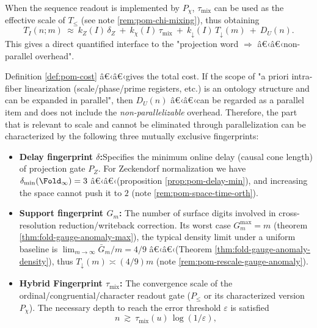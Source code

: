 \begin{remark}\label{rem:pom-cost-chi}
When the sequence readout is implemented by $P_\chi$, $\tau_{\mathrm{mix}}$ can be used as the effective scale of $T_{\le}$ (see note \ref{rem:pom-chi-mixing}), thus obtaining
\[
T_I(n;m)\ \approx\ k_Z(I)\,\delta_Z\ +\ k_\chi(I)\,\tau_{\mathrm{mix}}\ +\ k_{\downarrow}(I)\,T_{\downarrow}(m)\ +\ D_U(n).
\]
This gives a direct quantified interface to the "projection word $\Rightarrow$ â€‹â€‹non-parallel overhead".
\end{remark}

\begin{remark}\label{rem:pom-nonparallel-three-meters}
Definition \ref{def:pom-cost} â€‹â€‹gives the total cost.
If the scope of "a priori intra-fiber linearization (scale/phase/prime registers, etc.) is an ontology structure and can be expanded in parallel", then $D_U(n)$ â€‹â€‹can be regarded as a parallel item and does not include the \emph{non-parallelizable} overhead.
Therefore, the part that is relevant to scale and cannot be eliminated through parallelization can be characterized by the following three mutually exclusive fingerprints:
\begin{itemize}
  \item \textbf{Delay fingerprint \(\delta\):}Specifies the minimum online delay (causal cone length) of projection gate \(P_Z\). For Zeckendorf normalization we have
  \(\delta_{\min}(\Fold_\infty)=3\) â€‹â€‹(proposition \ref{prop:pom-delay-min}), and increasing the space cannot push it to \(2\) (note \ref{rem:pom-space-time-orth}).
  \item \textbf{Support fingerprint \(G_m\):} The number of surface digits involved in cross-resolution reduction/writeback correction. Its worst case \(G_m^{\max}=m\) (theorem \ref{thm:fold-gauge-anomaly-max}), the typical density limit under a uniform baseline is
  \(\lim_{m\to\infty}\bar G_m/m=4/9\) â€‹â€‹(Theorem \ref{thm:fold-gauge-anomaly-density}), thus \(T_{\downarrow}(m)\asymp (4/9)m\) (note \ref{rem:pom-rescale-gauge-anomaly}).
  \item \textbf{Hybrid Fingerprint \(\tau_{\mathrm{mix}}\):} The convergence scale of the ordinal/congruential/character readout gate (\(P_{\le}\) or its characterized version \(P_\chi\)). The necessary depth to reach the error threshold \(\varepsilon\) is satisfied
  \[
  n\ \gtrsim\ \tau_{\mathrm{mix}}(u)\,\log(1/\varepsilon),
\]
\end{itemize}
\end{remark}
